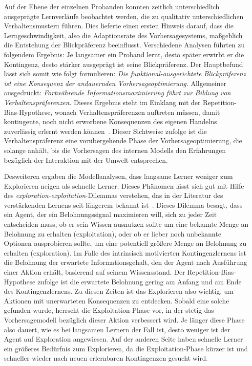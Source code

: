 \documentclass[a4paper]{scrreprt}
\begin{document}
Auf der Ebene der einzelnen Probanden konnten zeitlich unterschiedlich ausgepr\"agte Lernverl\"aufe beobachtet werden, die zu qualitativ unterschiedlichen Verhaltensmustern f\"uhren. Dies lieferte einen ersten Hinweis darauf, dass die Lerngeschwindigkeit, also die Adaptionsrate des Vorhersagesystems, ma\ss geblich die Entstehung der Blickpr\"aferenz beeinflusst. Verschiedene Analysen f\"uhrten zu folgendem Ergebnis: Je langsamer ein Proband lernt, desto sp\"ater erwirbt er die Kontingenz, desto st\"arker ausgepr\"agt ist seine Blickpr\"aferenz. Der Hauptbefund l\"asst sich somit wie folgt formulieren: \textit{Die funktional-ausgerichtete Blickpr\"aferenz ist eine Konsequenz der andauernden Vorhersageoptimierung.} Allgemeiner ausgedr\"uckt: \textit{Fortw\"ahrende Informationsmaximierung f\"uhrt zur Bildung von Verhaltenspr\"aferenzen.} 
Dieses Ergebnis steht im Einklang mit der Repetition-Bias-Hypothese, wonach Verhaltenspr\"aferenzen auftreten m\"ussen, damit kontingente, noch nicht erworbene Konsequenzen des eigenen Handelns zuverl\"assig erlernt werden k\"onnen~\cite{redgrave06,gurney12,redgrave12}. Dieser Sichtweise zufolge ist die Verhaltenspr\"aferenz eine vor\"ubergehende Phase der Vorhersageoptimierung, die solange anh\"alt, bis die Vorhersagen des internen Modells den Erfahrungen bez\"uglich der Interaktion mit der Umwelt entsprechen.

Desweiteren ergaben die Modellanalysen, dass langsame Lerner weniger zum Explorieren neigen als schnelle Lerner. Dieses Ph\"anomen l\"asst sich gut mit Hilfe des \textit{exploration-exploitation}-Dilemmas verstehen, das in der Literatur des verst\"arkenden Lernens seit l\"angerem bekannt ist~\cite{sutton98}. Dieses Dilemma besagt, dass ein Agent, der ein Belohnungssignal maximieren will, sich zu jeder Zeit entscheiden muss, ob er sein Wissen ausnutzen sollte um eine bekannte Menge an Belohnung zu erhalten (exploitation), oder ob er lieber noch unbekannte Optionen ausprobieren sollte, um eine potentiell gr\"o\ss ere Menge an Belohnung zu erhalten (exploration). Im Falle des intrinsisch motivierten Kontingenzlernens ist die Belohnung der erwartete Informationsgehalt, den der Agent nach Ausf\"uhrung einer Aktion erh\"alt, basierend auf seinem Wissensstand. Der Repetition-Bias-Hypothese zufolge ist die erwartete Belohnung gering am Anfang und am Ende des Kontingenzlernens. Zu diesen Zeiten ist das Explorieren also wichtig, um Aktionen mit unerwarteten Konsequenzen zu entdecken. Sobald eine solche gefunden wurde, herrscht die Exploitation-Phase vor, in der stetig das Vorhersagemodell bez\"uglich dieser Aktion verbessert wird. Je l\"anger diese Phase also dauert, wie es bei langsamen Lernern der Fall ist, desto weniger ist der Agent auf Exploration angewiesen. Auf der anderen Seite haben schnelle Lerner ein gr\"o\ss eres Bed\"urfnis zum Explorieren, da die Exploitation-Phase k\"urzer ist und schneller wieder nach neuen erlernbaren Kontingenzen gesucht wird.
\end{document}

